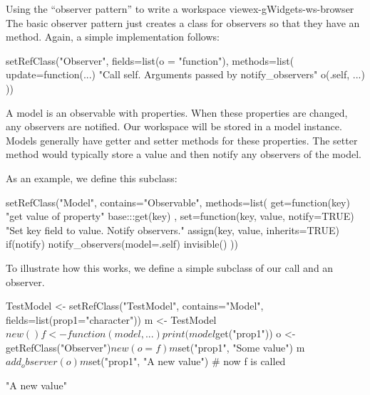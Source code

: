 \begin{example}{Using the ``observer pattern'' to write a workspace view}{ex-gWidgets-ws-browser}
The basic observer pattern just creates a class for observers so that
they have an  method. Again, a simple implementation
follows:


\begin{Schunk}
\begin{Sinput}
 setRefClass("Observer",
       fields=list(o = "function"),
       methods=list(
         update=function(...) {
           "Call self. Arguments passed by notify_observers"
           o(.self, ...)
         }))
\end{Sinput}
\end{Schunk}
%

A model is an observable with properties. When these properties are
changed, any observers are notified. Our workspace will be stored in a
model instance.  Models generally have getter and setter methods for
these properties. The setter method would typically store a value and
then notify any observers of the model.

As an example, we define this subclass:
\begin{Schunk}
\begin{Sinput}
 setRefClass("Model",
       contains="Observable",
       methods=list(
         get=function(key) {
           "get value of property"
           base:::get(key)
         },
         set=function(key, value, notify=TRUE) {
           "Set key field to value. Notify observers."
           assign(key, value, inherits=TRUE)
           if(notify)
             notify_observers(model=.self)
           invisible()
         }))
\end{Sinput}
\end{Schunk}
%



To illustrate how this works, we define a simple subclass of our
 call and an observer.
\begin{Schunk}
\begin{Sinput}
 TestModel <- setRefClass("TestModel",
                          contains="Model",
                          fields=list(prop1="character"))
 m <- TestModel$new()
 f <- function(model,...) print(model$get("prop1"))
 o <- getRefClass("Observer")$new(o=f)
 m$set("prop1", "Some value")
 m$add_observer(o)
 m$set("prop1", "A new value")           # now f is called
\end{Sinput}
\begin{Soutput}
[1] "A new value"
\end{Soutput}
\end{Schunk}




\end{example}
